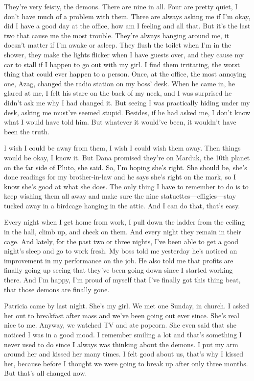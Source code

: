 They're very feisty, the demons. There are nine in all. Four are pretty
quiet, I don't have much of a problem with them. Three are always asking
me if I'm okay, did I have a good day at the office, how am I feeling
and all that. But it's the last two that cause me the most trouble.
They're always hanging around me, it doesn't matter if I'm awake or
asleep. They flush the toilet when I'm in the shower, they make the
lights flicker when I have guests over, and they cause my car to stall
if I happen to go out with my girl. I find them irritating, the worst
thing that could ever happen to a person. Once, at the office, the most
annoying one, Azag, changed the radio station on my boss' desk. When he
came in, he glared at me, I felt his stare on the back of my neck, and I
was surprised he didn't ask me why I had changed it. But seeing I was
practically hiding under my desk, asking me must've seemed stupid.
Besides, if he had asked me, I don't know what I would have told him.
But whatever it would've been, it wouldn't have been the truth.

I wish I could be away from them, I wish I could wish them away. Then
things would be okay, I know it. But Dana promised they're on Marduk,
the 10th planet on the far side of Pluto, she said. So, I'm hoping she's
right. She should be, she's done readings for my brother-in-law and he
says she's right on the mark, so I know she's good at what she does. The
only thing I have to remember to do is to keep wishing them all away and
make sure the nine statuettes---effigies---stay tucked away in a
birdcage hanging in the attic. And I can do that, that's easy.

Every night when I get home from work, I pull down the ladder from the
ceiling in the hall, climb up, and check on them. And every night they
remain in their cage. And lately, for the past two or three nights, I've
been able to get a good night's sleep and go to work fresh. My boss told
me yesterday he's noticed an improvement in my performance on the job.
He also told me that profits are finally going up seeing that they've
been going down since I started working there. And I'm happy, I'm proud
of myself that I've finally got this thing beat, that those demons are
finally gone.

Patricia came by last night. She's my girl. We met one Sunday, in
church. I asked her out to breakfast after mass and we've been going out
ever since. She's real nice to me. Anyway, we watched TV and ate
popcorn. She even said that she noticed I was in a good mood. I remember
smiling a lot and that's something I never used to do since I always was
thinking about the demons. I put my arm around her and kissed her many
times. I felt good about us, that's why I kissed her, because before I
thought we were going to break up after only three months. But that's
all changed now.

